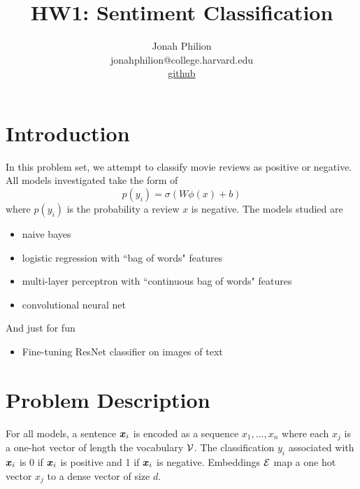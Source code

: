 \documentclass[11pt]{article}
\title{HW1: Sentiment Classification}
\author{Jonah Philion \\ jonahphilion@college.harvard.edu \\ \href{https://github.com/jonahthelion/cs287-s18/tree/master/HW1}{github}}
\begin{document}
\maketitle{}
\section{Introduction}

In this problem set, we attempt to classify movie reviews as positive or negative. All models investigated take the form of
$$ p(y_i) = \sigma(W\phi(x) + b)$$
where $p(y_i)$ is the probability a review $x$ is negative. The models studied are
\begin{itemize}
\item naive bayes
\item logistic regression with ``bag of words" features
\item multi-layer perceptron with ``continuous bag of words" features
\item convolutional neural net
\end{itemize}
And just for fun
\begin{itemize}
\item Fine-tuning ResNet classifier on images of text
\end{itemize}

%


\section{Problem Description}

For all models, a sentence $\boldsymbol{x}_i$ is encoded as a sequence $x_1,...,x_n$ where each $x_j$ is a one-hot vector of length the vocabulary $\mathcal{V}$. The classification $y_i$ associated with $\boldsymbol{x}_i$ is 0 if $\boldsymbol{x}_i$ is positive and 1 if $\boldsymbol{x}_i$ is negative. Embeddings $\mathcal{E}$ map a one hot vector $x_j$ to a dense vector of size $d$.
\end{document}
